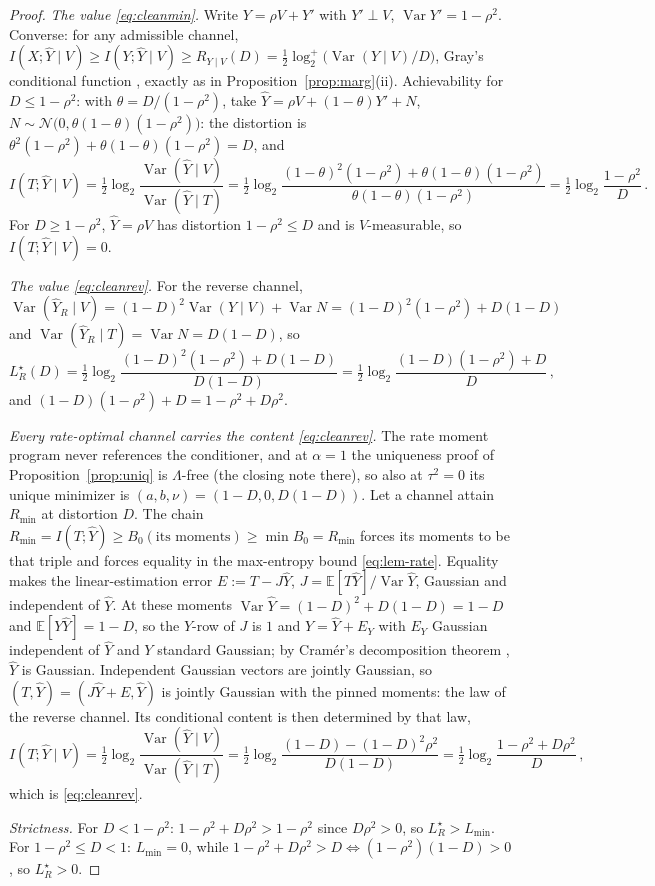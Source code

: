 \documentclass[11pt,onecolumn]{IEEEtran}
\newcommand{\E}{\mathbb{E}}
\newcommand{\hY}{\widehat{Y}}
\newcommand{\LRs}{L_{R}^{\star}}
\begin{document}
\begin{proof}
\emph{The value \eqref{eq:cleanmin}.} Write $Y=\rho V+Y'$ with
$Y'\perp V$, $\operatorname{Var}Y'=1-\rho^2$. Converse: for any
admissible channel, $I(X;\hY\mid V)\ge I(Y;\hY\mid V)\ge R_{Y\mid
V}(D)=\tfrac12\log_2^{+}\bigl(\operatorname{Var}(Y\mid
V)/D\bigr)$, Gray's conditional function \cite{gray1973}, exactly as
in Proposition~\ref{prop:marg}(ii). Achievability for $D\le1-\rho^2$:
with $\theta=D/(1-\rho^2)$, take
$\hY=\rho V+(1-\theta)Y'+N$, $N\sim\mathcal
N\bigl(0,\theta(1-\theta)(1-\rho^2)\bigr)$: the distortion is
$\theta^2(1-\rho^2)+\theta(1-\theta)(1-\rho^2)=D$, and
\[
I(T;\hY\mid V)
=\tfrac12\log_2
\frac{\operatorname{Var}(\hY\mid V)}{\operatorname{Var}(\hY\mid T)}
=\tfrac12\log_2
\frac{(1-\theta)^2(1-\rho^2)+\theta(1-\theta)(1-\rho^2)}
{\theta(1-\theta)(1-\rho^2)}
=\tfrac12\log_2\frac{1-\rho^2}{D}\,.
\]
For $D\ge1-\rho^2$, $\hY=\rho V$ has distortion $1-\rho^2\le D$ and is
$V$-measurable, so $I(T;\hY\mid V)=0$.

\emph{The value \eqref{eq:cleanrev}.} For the reverse channel,
$\operatorname{Var}(\hY_R\mid V)=(1-D)^2\operatorname{Var}(Y\mid
V)+\operatorname{Var}N=(1-D)^2(1-\rho^2)+D(1-D)$ and
$\operatorname{Var}(\hY_R\mid T)=\operatorname{Var}N=D(1-D)$, so
\[
\LRs(D)=\tfrac12\log_2
\frac{(1-D)^2(1-\rho^2)+D(1-D)}{D(1-D)}
=\tfrac12\log_2\frac{(1-D)(1-\rho^2)+D}{D}\,,
\]
and $(1-D)(1-\rho^2)+D=1-\rho^2+D\rho^2$.

\emph{Every rate-optimal channel carries the content
\eqref{eq:cleanrev}.} The rate moment program never references the
conditioner, and at $\alpha=1$ the uniqueness proof of
Proposition~\ref{prop:uniq} is $\Lambda$-free (the closing note
there), so also at $\tau^2=0$ its unique minimizer is
$(a,b,\nu)=(1-D,0,D(1-D))$. Let a channel attain $R_{\min}$ at
distortion $D$. The chain
$R_{\min}=I(T;\hY)\ge B_0(\text{its moments})\ge\min B_0=R_{\min}$
forces its moments to be that triple and forces equality in the
max-entropy bound \eqref{eq:lem-rate}. Equality makes the
linear-estimation error $E:=T-J\hY$,
$J=\E[T\hY]/\operatorname{Var}\hY$, Gaussian and independent of
$\hY$. At these moments $\operatorname{Var}\hY=(1-D)^2+D(1-D)=1-D$
and $\E[Y\hY]=1-D$, so the $Y$-row of $J$ is $1$ and
$Y=\hY+E_Y$ with $E_Y$ Gaussian independent of $\hY$ and $Y$ standard
Gaussian; by Cram\'er's decomposition theorem \cite{cramer1936},
$\hY$ is Gaussian. Independent Gaussian vectors are jointly Gaussian,
so $(T,\hY)=(J\hY+E,\hY)$ is jointly Gaussian with the pinned
moments: the law of the reverse channel. Its conditional content is
then determined by that law,
\[
I(T;\hY\mid V)
=\tfrac12\log_2
\frac{\operatorname{Var}(\hY\mid V)}{\operatorname{Var}(\hY\mid T)}
=\tfrac12\log_2\frac{(1-D)-(1-D)^2\rho^2}{D(1-D)}
=\tfrac12\log_2\frac{1-\rho^2+D\rho^2}{D}\,,
\]
which is \eqref{eq:cleanrev}.

\emph{Strictness.} For $D<1-\rho^2$:
$1-\rho^2+D\rho^2>1-\rho^2$ since $D\rho^2>0$, so $\LRs>L_{\min}$. For
$1-\rho^2\le D<1$: $L_{\min}=0$, while
$1-\rho^2+D\rho^2>D\Leftrightarrow(1-\rho^2)(1-D)>0$, so $\LRs>0$.
\end{proof}
\end{document}
